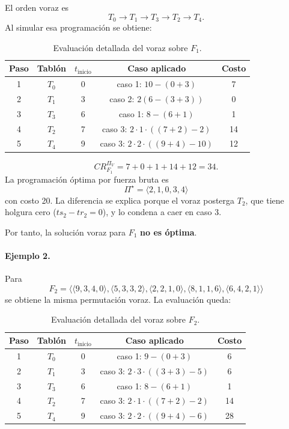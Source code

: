 \documentclass[12pt,a4paper]{article}
\begin{document}
El orden voraz es
\[
T_0 \rightarrow T_1 \rightarrow T_3 \rightarrow T_2 \rightarrow T_4.
\]
Al simular esa programaci\'on se obtiene:

\begin{table}[ht]
  \centering
  \small
  \begin{tabular}{ccccc}
    \toprule
    Paso & Tabl\'on & \(t_{\text{inicio}}\) & Caso aplicado & Costo \\
    \midrule
    1 & \(T_0\) & 0 & caso 1: \(10-(0+3)\) & 7 \\
    2 & \(T_1\) & 3 & caso 2: \(2(6-(3+3))\) & 0 \\
    3 & \(T_3\) & 6 & caso 1: \(8-(6+1)\) & 1 \\
    4 & \(T_2\) & 7 & caso 3: \(2\cdot1\cdot((7+2)-2)\) & 14 \\
    5 & \(T_4\) & 9 & caso 3: \(2\cdot2\cdot((9+4)-10)\) & 12 \\
    \bottomrule
  \end{tabular}
  \caption{Evaluaci\'on detallada del voraz sobre \(F_1\).}
\end{table}

\[
CR_{F_1}^{\Pi_V}=7+0+1+14+12=34.
\]
La programaci\'on \'optima por fuerza bruta es
\[
\Pi^\star=\langle 2,1,0,3,4\rangle
\]
con costo 20. La diferencia se explica porque el voraz posterga \(T_2\), que tiene holgura cero (\(ts_2-tr_2=0\)), y lo condena a caer en caso 3.

Por tanto, la soluci\'on voraz para \(F_1\) \textbf{no es \'optima}.

\paragraph{Ejemplo 2.}
Para
\[
F_2=\langle\langle 9,3,4,0\rangle,\langle 5,3,3,2\rangle,\langle 2,2,1,0\rangle,\langle 8,1,1,6\rangle,\langle 6,4,2,1\rangle\rangle
\]
se obtiene la misma permutaci\'on voraz. La evaluaci\'on queda:

\begin{table}[ht]
  \centering
  \small
  \begin{tabular}{ccccc}
    \toprule
    Paso & Tabl\'on & \(t_{\text{inicio}}\) & Caso aplicado & Costo \\
    \midrule
    1 & \(T_0\) & 0 & caso 1: \(9-(0+3)\) & 6 \\
    2 & \(T_1\) & 3 & caso 3: \(2\cdot3\cdot((3+3)-5)\) & 6 \\
    3 & \(T_3\) & 6 & caso 1: \(8-(6+1)\) & 1 \\
    4 & \(T_2\) & 7 & caso 3: \(2\cdot1\cdot((7+2)-2)\) & 14 \\
    5 & \(T_4\) & 9 & caso 3: \(2\cdot2\cdot((9+4)-6)\) & 28 \\
    \bottomrule
  \end{tabular}
  \caption{Evaluaci\'on detallada del voraz sobre \(F_2\).}
\end{table}
\end{document}
